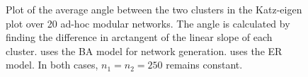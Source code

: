 \documentclass{IEEEtran}
\begin{document}
	\begin{figure}
		\centering
		\caption{Plot of the average angle between the two clusters in the Katz-eigen plot over 20 ad-hoc modular networks. The angle is calculated by finding the difference in arctangent of the linear slope of each cluster.  uses the BA model for network generation.  uses the ER model. In both cases, $n_1=n_2=250$ remains constant.}
		\label{fig:angle}
	\end{figure}
	
\end{document}
